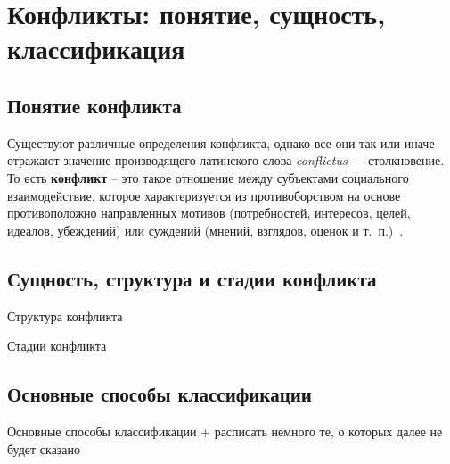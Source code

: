 \chapter{Конфликты: понятие, сущность, классификация}

\section{Понятие конфликта}

Существуют различные определения конфликта, однако все они так или иначе
отражают значение производящего латинского слова \textit{conflictus} ---
столкновение. То есть \textbf{конфликт} -- это такое отношение между
субъектами социального взаимодействие, которое характеризуется из
противоборством на основе противоположно направленных мотивов (потребностей,
интересов, целей, идеалов, убеждений) или суждений (мнений, взглядов,
оценок и т.~п.)~\cite{book07,book03}.

\section{Сущность, структура и стадии конфликта}

Структура конфликта

Стадии конфликта

\section{Основные способы классификации}
Основные способы классификации + расписать немного те, о которых далее не будет
сказано

